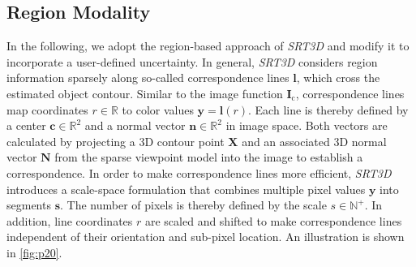 \documentclass[10pt,twocolumn,letterpaper]{article}
\begin{document}
\subsection{Region Modality}\label{ssec:p2}
In the following, we adopt the region-based approach of \textit{SRT3D} \cite{Stoiber2020b,Stoiber2021} and modify it to incorporate a user-defined uncertainty.
In general, \textit{SRT3D} considers region information sparsely along so-called correspondence lines $\pmb{l}$, which cross the estimated object contour.
Similar to the image function $\pmb{I}_\textrm{c}$, correspondence lines map coordinates $r \in \mathbb{R}$ to color values $\pmb{y} = \pmb{l}(r)$.
Each line is thereby defined by a center $\pmb{c} \in \mathbb{R}^2$ and a normal vector $\pmb{n} \in \mathbb{R}^2$ in image space.
Both vectors are calculated by projecting a 3D contour point $\pmb{X}$ and an associated 3D normal vector $\pmb{N}$ from the sparse viewpoint model into the image to establish a correspondence.
In order to make correspondence lines more efficient, \textit{SRT3D} introduces a scale-space formulation that combines multiple pixel values $\pmb{y}$ into segments $\pmb{s}$.
The number of pixels is thereby defined by the scale $s\in \mathbb{N}^+$.
In addition, line coordinates $r$ are scaled and shifted to make correspondence lines independent of their orientation and sub-pixel location.
An illustration is shown in \cref{fig:p20}.
\end{document}
